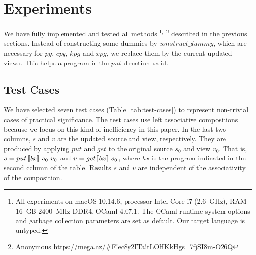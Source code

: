 \section{Experiments} \label{sect:experiments}

We have fully implemented and tested all methods%
%
\footnote{All experiments on macOS 10.14.6, processor Intel Core i7 (2.6~GHz), RAM 16~GB 2400~MHz DDR4, OCaml 4.07.1. The OCaml runtime system options and garbage collection parameters are set as default. Our target language is untyped.}$^,$%
%
\footnote{Anonymous \url{https://mega.nz/\#F!ec8y2ITa!tLOHKkHgs_7fjSI8m-O26Q}}
%
described in the previous sections.
Instead of constructing some dummies by $construct\_dummy$, which are necessary for $pg$, $cpg$, $kpg$ and $xpg$, we replace them by the current updated views. This helps a program in the $put$ direction valid.

\subsection{Test Cases}

We have 
selected seven test cases (Table~\ref{tab:test-cases}) to 
represent
non-trivial cases of practical significance.
The test cases use
left associative compositions because we focus on this kind of inefficiency in this paper.
In the last two columns, $s$ and $v$ are the updated source and view, respectively. They are produced by applying $put$ and $get$ to the original source $s_0$ and view $v_0$. That is, $s = put \, [\![bx]\!] \ s_0 \ v_0$ and $v = get \, [\![bx]\!] \ s_0$, where $bx$ is the program indicated in the second column of the table. 
Results $s$ and $v$ are independent of the associativity 
of the composition.

